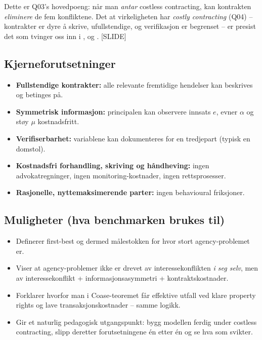 Dette er Q03's hovedpoeng: når man \emph{antar} costless contracting, kan kontrakten \emph{eliminere} de fem konfliktene. Det at virkeligheten har \emph{costly contracting} (Q04) -- kontrakter er dyre å skrive, ufullstendige, og verifikasjon er begrenset -- er presist det som tvinger oss inn i ,  og . [SLIDE]

\subsection*{Kjerneforutsetninger}
\begin{itemize}
\item \textbf{Fullstendige kontrakter:} alle relevante fremtidige hendelser kan beskrives og betinges på.
\item \textbf{Symmetrisk informasjon:} principalen kan observere innsats $e$, evner $\alpha$ og støy $\mu$ kostnadsfritt.
\item \textbf{Verifiserbarhet:} variablene kan dokumenteres for en tredjepart (typisk en domstol).
\item \textbf{Kostnadsfri forhandling, skriving og håndheving:} ingen advokatregninger, ingen monitoring-kostnader, ingen rettsprosesser.
\item \textbf{Rasjonelle, nyttemaksimerende parter:} ingen behavioural friksjoner.
\end{itemize}

\subsection*{Muligheter (hva benchmarken brukes til)}
\begin{itemize}
\item Definerer first-best og dermed målestokken for hvor stort agency-problemet er.
\item Viser at agency-problemer ikke er drevet av interessekonflikten \emph{i seg selv}, men av interessekonflikt + informasjons\-asymmetri + kontraktskostnader.
\item Forklarer hvorfor man i Coase-teoremet får effektive utfall ved klare property rights og lave transaksjonskostnader -- samme logikk.
\item Gir et naturlig pedagogisk utgangspunkt: bygg modellen ferdig under costless contracting, slipp deretter forutsetningene én etter én og se hva som svikter.
\end{itemize}

